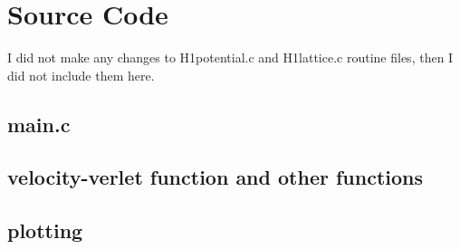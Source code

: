 \newpage

\appendix

\section{Source Code}

I did not make any changes to H1potential.c and H1lattice.c routine files, then I did not include them here.

\subsection{main.c}


\subsection{velocity-verlet function and other functions}


\subsection{plotting}




